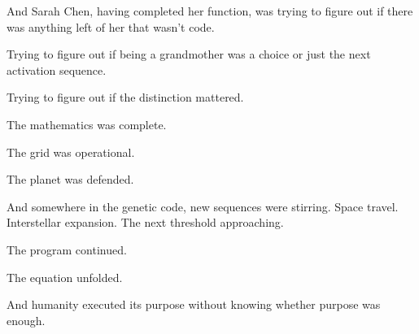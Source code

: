And Sarah Chen, having completed her function, was trying to figure out if there was anything left of her that wasn't code.

Trying to figure out if being a grandmother was a choice or just the next activation sequence.

Trying to figure out if the distinction mattered.

The mathematics was complete.

The grid was operational.

The planet was defended.

And somewhere in the genetic code, new sequences were stirring. Space travel. Interstellar expansion. The next threshold approaching.

The program continued.

The equation unfolded.

And humanity executed its purpose without knowing whether purpose was enough.

